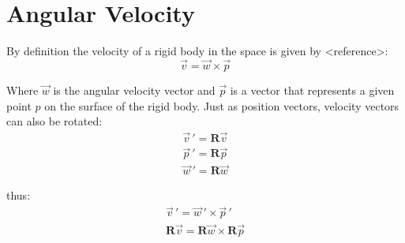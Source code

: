 \documentclass[a4paper]{report}
\begin{document}
\section{Angular Velocity}
By definition the velocity of a rigid body in the space is given by <reference>:
\begin{equation}
    \vec{v} = \vec{w} \times \vec{p}
\end{equation}

Where $\vec{w}$ is the angular velocity vector and $\vec{p}$ is a vector that
represents a given point $p$ on the surface of the rigid body. Just as position
vectors, velocity vectors can also be rotated:
\begin{equation}
\begin{split}
    \vec{v}\,' = \boldsymbol{R} \vec{v} \\
    \vec{p}\,' = \boldsymbol{R} \vec{p} \\
    \vec{w}\,' = \boldsymbol{R} \vec{w}
\end{split}
\end{equation}

thus:
\begin{equation}
\begin{split}
    \vec{v}\,' = \vec{w}\,' \times \vec{p}\,' \\
    \boldsymbol{R}\vec{v} = \boldsymbol{R} \vec{w} \times \boldsymbol{R} \vec{p}
\end{split}
\end{equation}
\end{document}
